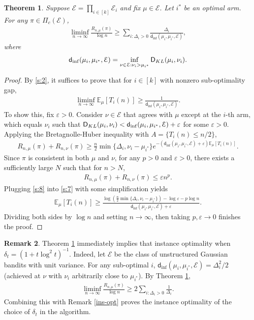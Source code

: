 \documentclass[letterpaper,11pt,openright,openany]{book}
\numberwithin{equation}{section}
\theoremstyle{plain}
\newtheorem{Th}{Theorem}[section]
\theoremstyle{definition}
\newtheorem{Rem}[Th]{Remark}
\def\E{{\mathbb E}}
\def\V{{\mathcal E}}
\def\e{{\varepsilon}}
\begin{document}
\begin{Th}\label{s:ins}
Suppose $\V = \prod_{i\in [k]}\V_i$ and fix $\mu\in\mathcal E$. Let $i^*$ be an optimal arm.  For any $\pi\in\Pi_c(\V)$,
\begin{align}
\liminf_{n\rightarrow\infty}\frac{R_{n,\mu}(\pi)}{\log n}\geq \sum_{i: \Delta_i>0}\frac{\Delta_i}{\mathsf d_{\inf} (\mu_i, \mu_{i^*}, \V)}, 
\end{align}
where $$\mathsf d_{\inf} (\mu_i, \mu_{i^*}, \V) = \inf_{\nu\in\V: \nu_i>\mu_{i^*}}\textsf D_{KL}(\mu_i, \nu_i).$$ 
\end{Th}

\begin{proof}
By \eqref{s:2}, it suffices to prove that for $i\in [k]$ with nonzero sub-optimality gap, 
\begin{align*}
\liminf_{n\to\infty}\E_\mu[T_i(n)]\geq \frac{1}{\mathsf d_{\inf} (\mu_i, \mu_{i^*}, \V)}.
\end{align*}
To show this, fix $\e>0$. Consider $\nu\in\V$ that agrees with $\mu$ except at the $i$-th arm, which equals $\nu_i$ such that $\textsf D_{KL}(\mu_i, \nu_i) < \mathsf d_{\inf} (\mu_i, \mu_{i^*}, \V)+\e$ for some $\e>0$. Applying the Bretagnolle-Huber inequality with $A = \{T_i(n)\leq n/2\}$, 
\begin{align}
R_{n, \mu}(\pi)+R_{n, \nu}(\pi)\geq\frac{n}{2}\min\{\Delta_i, \nu_i-\mu_{i^*}\}e^{-(\mathsf d_{\inf} (\mu_i, \mu_{i^*}, \V)+\e)\E_\mu[T_i(n)]}.\label{s:7}
\end{align}
Since $\pi$ is consistent in both $\mu$ and $\nu$, for any $p>0$ and $\e>0$, there exists a sufficiently large $N$ such that for $n>N$, 
\begin{align}
R_{n, \mu}(\pi)+R_{n, \nu}(\pi)\leq \e n^p. \label{s:8}
\end{align}
Plugging \eqref{s:8} into \eqref{s:7} with some simplification yields
\begin{align*}
\E_\mu[T_i(n)]\geq\frac{\log\left(\frac{n}{2}\min\{\Delta_i, \nu_i-\mu_{i^*}\}\right)-\log\e-p\log n}{\mathsf d_{\inf} (\mu_i, \mu_{i^*}, \V)+\e}. 
\end{align*}
Dividing both sides by $\log n$ and setting $n\to\infty$, then taking $p, \e\to 0$ finishes the proof.  
\end{proof}
\begin{Rem}
Theorem \ref{s:ins} immediately implies that instance optimality when $\delta_t = (1+t\log^2 t)^{-1}$. Indeed, let $\V$ be the class of unstructured Gaussian bandits with unit variance. For any sub-optimal $i$,  $\mathsf d_{\inf} (\mu_i, \mu_{i^*}, \V)=\Delta_i^2/2$ (achieved at $\nu$ with $\nu_i$ arbitrarily close to $\mu_{i^*}$).  By Theorem \ref{s:ins}, 
\begin{align*}
\liminf_{n\rightarrow\infty}\frac{R_{n,\mu}(\pi)}{\log n}\geq 2\sum_{i: \Delta_i>0}\frac{1}{\Delta_i}. 
\end{align*}
Combining this with Remark \ref{ins-opt} proves the instance optimality of the choice of $\delta_t$ in the algorithm. 
\end{Rem}
\end{document}
